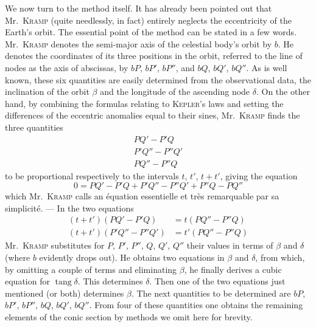We now turn to the method itself. It has already been pointed out that Mr.\ \textsc{Kramp} (quite needlessly, in fact) entirely neglects the eccentricity of the Earth’s orbit. The essential point of the method can be stated in a few words. Mr.\ \textsc{Kramp} denotes the semi-major axis of the celestial body’s orbit by $b$. He denotes the coordinates of its three positions in the orbit, referred to the line of nodes as the axis of abscissas, by $bP$, $bP'$, $bP''$, and $bQ$, $bQ'$, $bQ''$. As is well known, these six quantities are easily determined from the observational data, the inclination of the orbit $\beta$ and the longitude of the ascending node $\delta$. On the other hand, by combining the formulas relating to \textsc{Kepler}’s laws and setting the differences of the eccentric anomalies equal to their sines, Mr.\ \textsc{Kramp} finds the three quantities
\[
\begin{gathered}
PQ' - P'Q\\
P'Q'' - P''Q'\\
PQ'' - P''Q
\end{gathered}
\]
to be proportional respectively to the intervals $t$, $t'$, $t+t'$, giving the equation
\[
0 = PQ' - P'Q + P'Q'' - P''Q' + P''Q - PQ''
\]
which Mr.\ \textsc{Kramp} calls an équation essentielle et très remarquable par sa simplicité. --- In the two equations
\[
\begin{aligned}
(t+t')(PQ'-P'Q) &= t(PQ''-P''Q)\\
(t+t')(P'Q''-P''Q') &= t'(PQ''-P''Q)
\end{aligned}
\]
Mr.\ \textsc{Kramp} substitutes for $P$, $P'$, $P''$, $Q$, $Q'$, $Q''$ their values in terms of $\beta$ and $\delta$ (where $b$ evidently drops out). He obtains two equations in $\beta$ and $\delta$, from which, by omitting a couple of terms and eliminating $\beta$, he finally derives a cubic equation for $\operatorname{tang}\delta$. This determines $\delta$. Then one of the two equations just mentioned (or both) determines $\beta$. The next quantities to be determined are $bP$, $bP'$, $bP''$, $bQ$, $bQ'$, $bQ''$. From four of these quantities one obtains the remaining elements of the conic section by methods we omit here for brevity.

